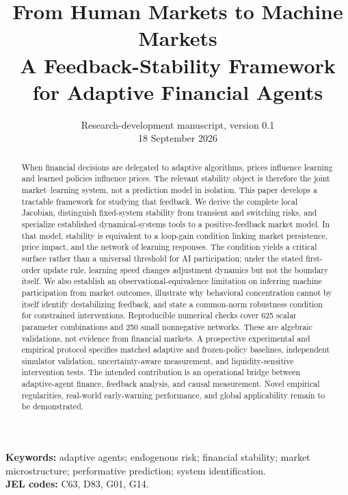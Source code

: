 \documentclass[11pt,a4paper]{article}
\title{\textbf{From Human Markets to Machine Markets}\\[0.45em]
\large A Feedback-Stability Framework for Adaptive Financial Agents}
\author{}
\date{Research-development manuscript, version 0.1\\18 September 2026}
\theoremstyle{definition}
\theoremstyle{remark}
\begin{document}
\maketitle
\vspace{-1.4em}
\begin{abstract}
When financial decisions are delegated to adaptive algorithms, prices influence learning and learned policies influence prices. The relevant stability object is therefore the joint market--learning system, not a prediction model in isolation. This paper develops a tractable framework for studying that feedback. We derive the complete local Jacobian, distinguish fixed-system stability from transient and switching risks, and specialize established dynamical-systems tools to a positive-feedback market model. In that model, stability is equivalent to a loop-gain condition linking market persistence, price impact, and the network of learning responses. The condition yields a critical surface rather than a universal threshold for AI participation; under the stated first-order update rule, learning speed changes adjustment dynamics but not the boundary itself. We also establish an observational-equivalence limitation on inferring machine participation from market outcomes, illustrate why behavioral concentration cannot by itself identify destabilizing feedback, and state a common-norm robustness condition for constrained interventions. Reproducible numerical checks cover 625 scalar parameter combinations and 250 small nonnegative networks. These are algebraic validations, not evidence from financial markets. A prospective experimental and empirical protocol specifies matched adaptive and frozen-policy baselines, independent simulator validation, uncertainty-aware measurement, and liquidity-sensitive intervention tests. The intended contribution is an operational bridge between adaptive-agent finance, feedback analysis, and causal measurement. Novel empirical regularities, real-world early-warning performance, and global applicability remain to be demonstrated.
\end{abstract}
\noindent\textbf{Keywords:} adaptive agents; endogenous risk; financial stability; market microstructure; performative prediction; system identification.\\
\textbf{JEL codes:} C63, D83, G01, G14.

\begin{center}
\end{center}
\end{document}
